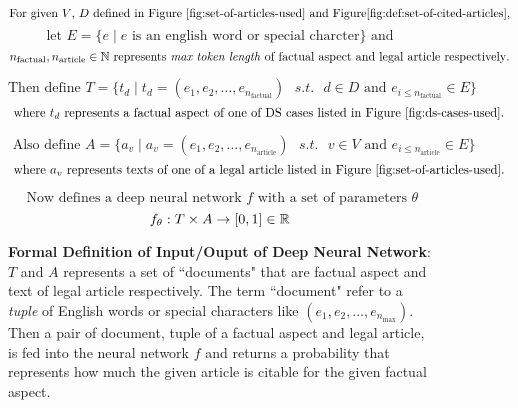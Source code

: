 \begin{figure}[ht]
    \[\text{For given $V$, $D$ defined in Figure \ref{fig:set-of-articles-used} and  Figure\ref{fig:def:set-of-cited-articles},}\]
    \[\text{ let } E = \{e \mid e \text{ is an english word or special charcter} \} \text{ and }\]
    \[n_{\text{factual}}, n_{\text{article}} \in \Bbb N \text{ represents \textit{max token length} of factual aspect and legal article respectively}. \]
    
    \[\text{Then define } T = \{t_d \mid t_d = (e_1, e_2, \ldots , e_{n_\text{factual}}) \text{ } s.t. \text{ } d \in D \text{ and } e_{i \le{n_{\text{factual}}}  } \in E \} \]
    \[\text{ where } t_d \text{ represents a factual aspect of one of DS cases listed in Figure \ref{fig:ds-cases-used}. }\]
    
    \[\text{ Also define } A = \{a_v \mid a_v = (e_1, e_2, \ldots , e_{n_\text{article}}) \text{ } s.t. \text{ } v \in V \text{ and } e_{i \le{n_{\text{article}}}  } \in E \}  \]
    \[\text{ where } a_v \text{ represents texts of one of a legal article listed in Figure \ref{fig:set-of-articles-used}. }\]

    \[\text{ Now defines a deep neural network } f \text{ with a set of parameters } \theta \]
    \[f_{\theta}: T \times A \to [0, 1] \in \Bbb R \]


    \caption{\textbf{Formal Definition of Input/Ouput of Deep Neural Network}: $T$ and $A$ represents a set of ``documents" that are factual aspect and text of legal article respectively. The term ``document" refer to a \textit{tuple} of English words or special characters like $(e_1, e_2, \ldots, e_{n_\text{max}})$. Then a pair of document, tuple of a factual aspect and legal article, is fed into the neural network $f$ and returns a probability that represents how much the given article is citable for the given factual aspect.}
    \label{fig:def:io:nn}

\end{figure}